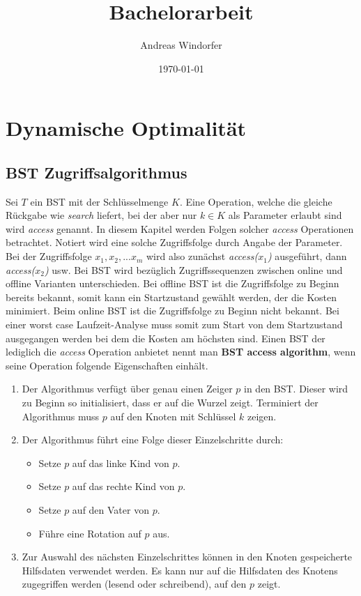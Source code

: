 \documentclass[a4paper,12pt]{article}
\title{Bachelorarbeit}
\author{

	Andreas Windorfer\\
}
\date{\today}
\begin{document}
\maketitle
\newpage

\tableofcontents
\newpage

\section{Dynamische Optimalität}

\subsection{BST Zugriffsalgorithmus }
Sei $T$ ein BST mit der Schlüsselmenge $K$. Eine Operation, welche die gleiche Rückgabe wie \textit{search} liefert, bei der aber nur $k \in K $ als Parameter erlaubt sind wird \textit{access} genannt. In diesem Kapitel werden Folgen solcher \textit{access} Operationen betrachtet. Notiert wird eine solche Zugriffsfolge durch Angabe der Parameter. Bei der Zugriffsfolge $x_1,x_2,...x_m$ wird also zunächst \textit{access($x_1$)} ausgeführt, dann \textit{access($x_2$)} usw.  Bei BST wird bezüglich Zugriffssequenzen zwischen online und offline Varianten unterschieden. Bei offline BST ist die Zugriffsfolge zu Beginn bereits bekannt, somit kann ein Startzustand gewählt werden, der die Kosten minimiert. Beim online BST ist die Zugriffsfolge zu Beginn nicht bekannt. Bei einer worst case Laufzeit-Analyse muss somit zum Start von dem Startzustand ausgegangen werden bei dem die Kosten am höchsten sind.
Einen BST der lediglich die \textit{access} Operation anbietet nennt man \textbf{BST access algorithm}, wenn seine Operation folgende Eigenschaften einhält. 

\begin{enumerate} 
	\item Der Algorithmus verfügt über genau einen Zeiger $p$ in den BST. Dieser wird zu Beginn so initialisiert, dass er auf die Wurzel zeigt. Terminiert der Algorithmus muss $p$ auf den Knoten mit Schlüssel $k$ zeigen.
	\item Der Algorithmus führt eine Folge dieser Einzelschritte durch:
	\begin{itemize}
		\item Setze $p$ auf das linke Kind von $p$.
		\item Setze $p$ auf das rechte Kind von $p$.
		\item Setze $p$ auf den Vater von $p$.
		\item Führe eine Rotation auf $p$ aus.
	\end{itemize}  
	\item  Zur Auswahl des nächsten Einzelschrittes können in den Knoten gespeicherte Hilfsdaten verwendet werden. Es kann nur auf die Hilfsdaten des Knotens zugegriffen werden (lesend oder schreibend), auf den $p$ zeigt.    
\end{enumerate}
\end{document}
